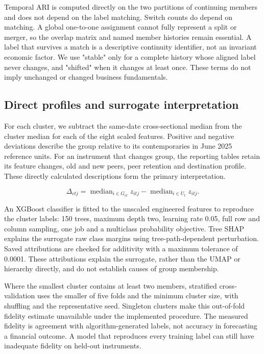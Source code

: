 Temporal ARI is computed directly on the two partitions of continuing members and does not depend on the label matching. Switch counts do depend on matching. A global one-to-one assignment cannot fully represent a split or merger, so the overlap matrix and named member histories remain essential. A label that survives a match is a descriptive continuity identifier, not an invariant economic factor. We use "stable" only for a complete history whose aligned label never changes, and "shifted" when it changes at least once. These terms do not imply unchanged or changed business fundamentals.


\subsection{Direct profiles and surrogate interpretation}

For each cluster, we subtract the same-date cross-sectional median from the cluster median for each of the eight scaled features. Positive and negative deviations describe the group relative to its contemporaries in June 2025 reference units. For an instrument that changes group, the reporting tables retain its feature changes, old and new peers, peer retention and destination profile. These directly calculated descriptions form the primary interpretation.


\begin{equation}
\Delta_{ctj}=\operatorname{median}_{i\in G_{ct}}z_{itj}-\operatorname{median}_{i\in U_t}z_{itj}.
\label{eq:profiles}\end{equation}

An XGBoost classifier is fitted to the unscaled engineered features to reproduce the cluster labels: 150 trees, maximum depth two, learning rate 0.05, full row and column sampling, one job and a multiclass probability objective. Tree SHAP explains the surrogate raw class margins using tree-path-dependent perturbation. Saved attributions are checked for additivity with a maximum tolerance of 0.0001. These attributions explain the surrogate, rather than the UMAP or hierarchy directly, and do not establish causes of group membership.


Where the smallest cluster contains at least two members, stratified cross-validation uses the smaller of five folds and the minimum cluster size, with shuffling and the representative seed. Singleton clusters make this out-of-fold fidelity estimate unavailable under the implemented procedure. The measured fidelity is agreement with algorithm-generated labels, not accuracy in forecasting a financial outcome. A model that reproduces every training label can still have inadequate fidelity on held-out instruments.


